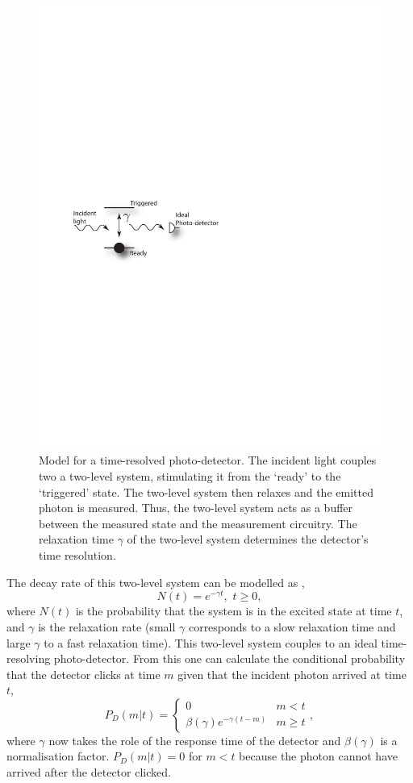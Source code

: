 \documentclass[aps,pra,twocolumn,amsmath,amssymb,color,superscriptaddress]{revtex4}
\begin{document}
\begin{figure}[!htb]
\includegraphics[width=0.7\columnwidth]{figures/detector_model}
\caption{Model for a time-resolved photo-detector. The incident light couples two a two-level system, stimulating it from the `ready' to the `triggered' state. The two-level system then relaxes and the emitted photon is measured. Thus, the two-level system acts as a buffer between the measured state and the measurement circuitry. The relaxation time $\gamma$ of the two-level system determines the detector's time resolution.} \label{fig:det_model}
\end{figure}

The decay rate of this two-level system can be modelled as \cite{bib:loudon2000quantum},
\begin{equation}
N(t)=e^{-\gamma t}, \,\, t\geq 0,
\end{equation}
where $N(t)$ is the probability that the system is in the excited state at time $t$, and $\gamma$ is the relaxation rate (small $\gamma$ corresponds to a slow relaxation time and large $\gamma$ to a fast relaxation time). This two-level system couples to an ideal time-resolving photo-detector. From this one can calculate the conditional probability that the detector clicks at time $m$ given that the incident photon arrived at time $t$,
\begin{equation}
   P_D(m|t)=  \left\{
     \begin{array}{lr}
       0 & m < t \\
       \beta(\gamma) e^{-\gamma(t-m)} & m \geq t
     \end{array},
   \right.
\end{equation}
where $\gamma$ now takes the role of the response time of the detector and $\beta(\gamma)$ is a normalisation factor. \mbox{$P_D(m|t)=0$} for \mbox{$m<t$} because the photon cannot have arrived after the detector clicked. 
\end{document}

